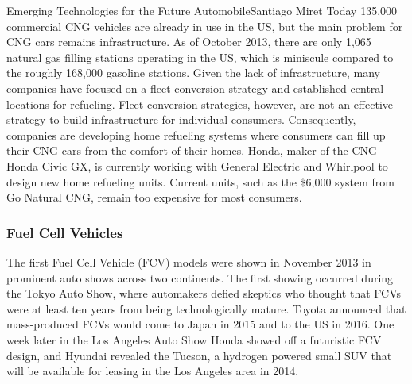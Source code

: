 \documentclass[10pt]{papertex}
\begin{document}
\begin{news}{2}{Emerging Technologies for the Future Automobile}{Santiago Miret}{}{}
Today 135,000 commercial CNG vehicles are already in use in the US, but the main
problem for CNG cars remains infrastructure. As of October 2013, there are only
1,065 natural gas filling stations operating in the US, which is miniscule
compared to the roughly 168,000 gasoline stations. Given the lack of
infrastructure, many companies have focused on a fleet conversion strategy and
established central locations for refueling. Fleet conversion strategies,
however, are not an effective strategy to build infrastructure for individual
consumers. Consequently, companies are developing home refueling systems where
consumers can fill up their CNG cars from the comfort of their homes. Honda,
maker of the CNG Honda Civic GX, is currently working with General Electric and
Whirlpool to design new home refueling units. Current units, such as the \$6,000
system from Go Natural CNG, remain too expensive for most consumers.


\subsubsection*{Fuel Cell Vehicles}

The first Fuel Cell Vehicle (FCV) models were shown in November 2013 in
prominent auto shows across two continents. The first showing occurred during
the Tokyo Auto Show, where automakers defied skeptics who thought that FCVs were
at least ten years from being technologically mature. Toyota announced that
mass-produced FCVs would come to Japan in 2015 and to the US in 2016. One week
later in the Los Angeles Auto Show Honda showed off a futuristic FCV design, and
Hyundai revealed the Tucson, a hydrogen powered small SUV that will be available
for leasing in the Los Angeles area in 2014.


\end{news}
\end{document}
